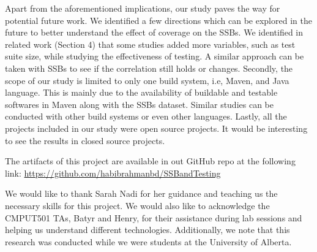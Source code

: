 \documentclass[sigconf,nonacm]{acmart}
\begin{document}
Apart from the aforementioned implications, our study paves the way for potential future work. We identified a few directions which can be explored in the future to better understand the effect of coverage on the SSBs. We identified in related work (Section 4) that some studies added more variables, such as test suite size, while studying the effectiveness of testing. A similar approach can be taken with SSBs to see if the correlation still holds or changes. Secondly, the scope of our study is limited to only one build system, i.e, Maven, and Java language. This is mainly due to the availability of buildable and testable softwares in Maven along with the SSBs dataset. Similar studies can be conducted with other build systems or even other languages. Lastly, all the projects included in our study were open source projects. It would be interesting to see the results in closed source projects.

The artifacts of this project are available in out GitHub repo at the following link:
\href{https://github.com/habibrahmanbd/SSBandTesting}{https://github.com/habibrahmanbd/SSBandTesting}

\begin{acks}
	We would like to thank Sarah Nadi for her guidance and teaching us the necessary skills for this project. We would also like to acknowledge the CMPUT501 TAs, Batyr and Henry, for their assistance during lab sessions and helping us understand different technologies. Additionally, we note that this research was conducted while we were students at the University of Alberta.
\end{acks}
\end{document}
